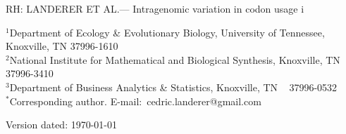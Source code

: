 \documentclass[12pt]{article}
\begin{document}
\doublespacing
\linenumbers

\newcommand{\kluyveri}{\textit{L. kluyveri}\xspace}


\noindent RH: LANDERER ET AL.--- Intragenomic variation in codon usage
i
\bigskip
\medskip
\begin{center}

\bigskip





\end{center}

\vfill

{\small
\noindent$^{1}$Department of Ecology \& Evolutionary Biology, University of Tennessee, Knoxville, TN 37996-1610\\
\noindent$^{2}$National Institute for Mathematical and Biological Synthesis, Knoxville, TN 37996-3410\\
\noindent$^{3}$Department of Business Analytics \& Statistics, Knoxville, TN ~ 37996-0532 \\
\noindent$^{*}$Corresponding author. E-mail:~cedric.landerer@gmail.com
}

\vfill
\centerline{Version dated: \today}
\vfill
\newpage
\end{document}
